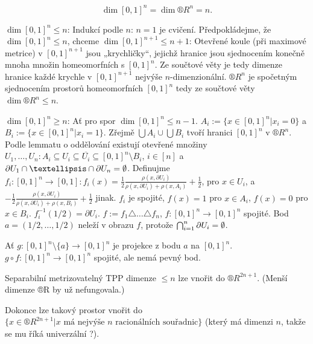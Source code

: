 \documentclass[12pt]{article}                   %
\begin{document}
        \begin{veta}
            $$ \dim [0, 1]^n = \dim ®R^n = n. $$

            \begin{dukazin}[Myšlenka]
                $\dim [0, 1]^n ≤ n$: Indukcí podle $n$: $n = 1$ je cvičení. Předpokládejme, že $\dim [0, 1]^n ≤ n$, chceme $\dim [0, 1]^{n+1} ≤ n+1$: Otevřené koule (při maximové metrice) v $[0, 1]^{n+1}$ jsou „krychličky“, jejichž hranice jsou sjednocením konečně mnoha množin homeomorfních s $[0, 1]^n$. Ze součtové věty je tedy dimenze hranice každé krychle v $[0, 1]^{n+1}$ nejvýše $n$-dimenzionální. $®R^n$ je spočetným sjednocením prostorů homeomorfních $[0, 1]^n$ tedy ze součtové věty $\dim ®R^n ≤ n$.

                $\dim [0, 1]^n ≥ n$: Ať pro spor $\dim [0, 1]^n ≤ n-1$. $A_i := \{x \in [0, 1]^n | x_i = 0\}$ a $B_i := \{x \in [0, 1]^n | x_i = 1\}$. Zřejmě $\bigcup A_i \cup \bigcup B_i$ tvoří hranici $[0, 1]^n$ v $®R^n$. Podle lemmatu o oddělování existují otevřené množiny $U_1, …, U_n: A_i \subseteq U_i \subseteq \overline{U_i} \subseteq [0, 1]^n \setminus B_i$, $i \in [n]$ a $\partial U_1 \cap … \cap \partial U_n = \O$. Definujme $f_i : [0, 1]^n \rightarrow [0, 1]: f_i(x) = \frac{1}{2}\frac{\rho(x, \partial U_i)}{\rho(x, \partial U_i) + \rho(x, A_i)} + \frac{1}{2}$, pro $x \in U_i$, a $-\frac{1}{2}\frac{\rho(x, \partial U_i)}{\rho(x, \partial U_i) + \rho(x, B_i)} + \frac{1}{2}$ jinak. $f_i$ je spojité, $f(x) = 1$ pro $x \in A_i$, $f(x) = 0$ pro $x \in B_i$. $f_i^{-1}(1/2) = \partial U_i$. $f := f_1 \triangle … \triangle f_n$, $f: [0, 1]^n \rightarrow [0, 1]^n$ spojité. Bod $a = (1/2, …, 1/2)$ neleží v obrazu $f$, protože $\bigcap_{i=1}^n \partial U_i = \emptyset$.

                Ať $g: [0, 1]^n \setminus \{a\} \rightarrow [0, 1]^n$ je projekce z bodu $a$ na $[0, 1]^n$. $g \circ f: [0, 1]^n \rightarrow [0, 1]^n$ spojité, ale nemá pevný bod.
            \end{dukazin}
        \end{veta}

        \begin{veta}
            Separabilní metrizovatelný TPP dimenze $≤ n$ lze vnořit do $®R^{2n+1}$. (Menší dimenze ®R by už nefungovala.)

            Dokonce lze takový prostor vnořit do $\{x \in ®R^{2n+1} | x \text{ má nejvýše $n$ racionálních souřadnic}\}$ (který má dimenzi $n$, takže se mu říká univerzální ?).
        \end{veta}
\end{document}
